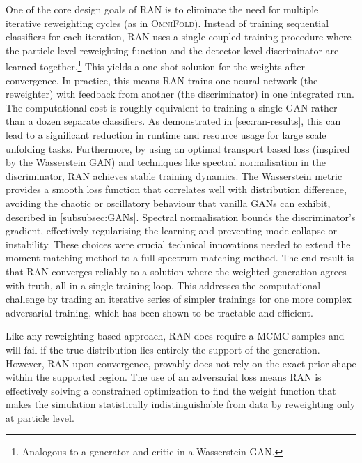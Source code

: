 {{        One of the core design goals of RAN is to eliminate the need for multiple iterative reweighting cycles (as in \textsc{OmniFold}).
        Instead of training sequential classifiers for each iteration, RAN uses a single coupled training procedure where the particle level reweighting function and the detector level discriminator are learned together.\footnote{Analogous to a generator and critic in a Wasserstein GAN.}
        This yields a one shot solution for the weights after convergence.
        In practice, this means RAN trains one neural network (the reweighter) with feedback from another (the discriminator) in one integrated run.
        The computational cost is roughly equivalent to training a single GAN rather than a dozen separate classifiers.
        As demonstrated in \cref{sec:ran-results}, this can lead to a significant reduction in runtime and resource usage for large scale unfolding tasks.
        Furthermore, by using an optimal transport based loss (inspired by the Wasserstein GAN) and techniques like spectral normalisation in the discriminator, RAN achieves stable training dynamics.
        The Wasserstein metric provides a smooth loss function that correlates well with distribution difference, avoiding the chaotic or oscillatory behaviour that vanilla GANs can exhibit, described in \cref{subsubsec:GANs}.
        Spectral normalisation bounds the discriminator's gradient, effectively regularising the learning and preventing mode collapse or instability.
        These choices were crucial technical innovations needed to extend the moment matching method to a full spectrum matching method.
        The end result is that RAN converges reliably to a solution where the weighted generation agrees with truth, all in a single training loop.
        This addresses the computational challenge by trading an iterative series of simpler trainings for one more complex adversarial training, which has been shown to be tractable and efficient.

        Like any reweighting based approach, RAN does require a MCMC samples and will fail if the true distribution lies entirely the support of the generation.
        However, RAN upon convergence, provably does not rely on the exact prior shape within the supported region.
        The use of an adversarial loss means RAN is effectively solving a constrained optimization to find the weight function that makes the simulation statistically indistinguishable from data by reweighting only at particle level.
        
}}
